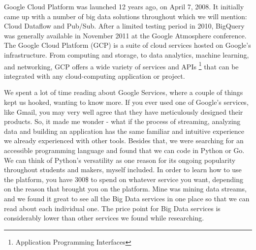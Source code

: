 Google Cloud Platform was launched 12 years ago, on April 7, 2008. It initially came up with a number of big data solutions throughout which we will mention: Cloud Dataflow and Pub/Sub. \cite{GoogleCloudPlatform} After a limited testing period in 2010, BigQuery was generally available in November 2011 at the Google Atmosphere conference. The Google Cloud Platform (GCP) is a suite of cloud services hosted on Google's infrastructure. From computing and storage, to data analytics, machine learning, and networking, GCP offers a wide variety of services and APIs \footnote{Application Programming Interfaces} that can be integrated with any cloud-computing application or project. 

We spent a lot of time reading about Google Services, where a couple of things kept us hooked, wanting to know more. If you ever used one of Google's services, like Gmail, you may very well agree that they have meticulously designed their products. So, it made me wonder - what if the process of streaming, analyzing data and building an application has the same familiar and intuitive experience we already experienced with other tools. Besides that, we were searching for an accessible programming language and found that we can code in Python or Go. We can think of Python's versatility as one reason for its ongoing popularity throughout students and makers, myself included. In order to learn how to use the platform, you have 300\$ to spend on whatever service you want, depending on the reason that brought you on the platform. Mine was mining data streams, and we found it great to see all the Big Data services in one place so that we can read about each individual one. The price point for Big Data services is considerably lower than other services we found while researching.

